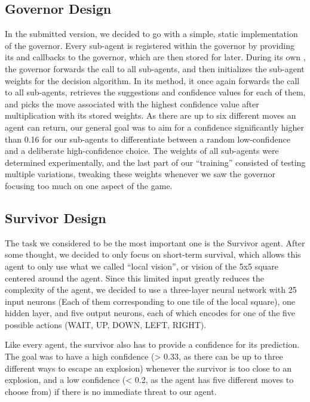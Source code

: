 \subsection{Governor Design}
\label{subsec:design-governor}
In the submitted version, we decided to go with a simple, static implementation of the governor.
Every sub-agent is registered within the governor by providing its  and 
callbacks to the governor, which are then stored for later.
During its own , the governor forwards the call to all sub-agents, and then initializes the
sub-agent weights for the decision algorithm.
In its  method, it once again forwards the call to all sub-agents, retrieves the suggestions and
confidence values for each of them, and picks the move associated with the highest confidence value after multiplication
with its stored weights.
As there are up to six different moves an agent can return, our general goal was to aim for a confidence significantly
higher than 0.16 for our sub-agents to differentiate between a random low-confidence and a deliberate high-confidence
choice.
The weights of all sub-agents were determined experimentally, and the last part of our \enquote{training} consisted of
testing multiple variations, tweaking these weights whenever we saw the governor focusing too much on one aspect of the
game.

\subsection{Survivor Design}
\label{subsec:survivor-design}
The task we considered to be the most important one is the Survivor agent.
After some thought, we decided to only focus on short-term survival, which allows this agent to only use what we called
\enquote{local vision}, or vision of the 5x5 square centered around the agent.
Since this limited input greatly reduces the complexity of the agent, we decided to use a three-layer neural network
with 25 input neurons (Each of them corresponding to one tile of the local square), one hidden layer, and five output
neurons, each of which encodes for one of the five possible actions (WAIT, UP, DOWN, LEFT, RIGHT).

Like every agent, the survivor also has to provide a confidence for its prediction.
The goal was to have a high confidence (> 0.33, as there can be up to three different ways to escape an explosion)
whenever the survivor is too close to an explosion, and a low confidence (< 0.2, as the agent has five different moves
to choose from) if there is no immediate threat to our agent.

